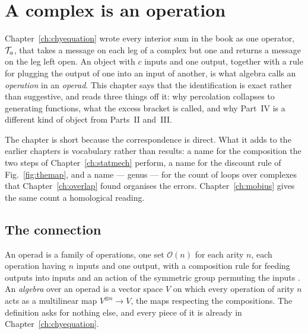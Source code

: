 \chapter{A complex is an operation}
\label{ch:operads}


Chapter~\ref{ch:chyequation} wrote every interior sum in the book as one
operator, $\mathcal{T}_{a}$, that takes a message on each leg of a complex but one
and returns a message on the leg left open. An object with $c$ inputs and one
output, together with a rule for plugging the output of one into an input of
another, is what algebra calls an \emph{operation} in an \emph{operad}. This
chapter says that the identification is exact rather than suggestive, and
reads three things off it: why percolation collapses to generating functions,
what the excess bracket is called, and why Part~IV is a different kind of
object from Parts~II and~III.

The chapter is short because the correspondence is direct. What it adds to
the earlier chapters is vocabulary rather than results: a name for the
composition the two steps of Chapter~\ref{ch:statmech} perform, a name for
the discount rule of Fig.~\ref{fig:themap}, and a name --- genus --- for the
count of loops over complexes that Chapter~\ref{ch:overlap} found organises
the errors. Chapter~\ref{ch:mobius} gives the same count a homological
reading.

\section{The connection}
\label{sec:op-connection}

An operad is a family of operations, one set $\mathcal{O}(n)$ for each arity
$n$, each operation having $n$ inputs and one output, with a composition rule
for feeding outputs into inputs and an action of the symmetric group
permuting the inputs \citep{markl2002}. An \emph{algebra} over an operad is a
vector space $V$ on which every operation of arity $n$ acts as a multilinear
map $V^{\otimes n}\to V$, the maps respecting the compositions. The
definition asks for nothing else, and every piece of it is already in
Chapter~\ref{ch:chyequation}.

